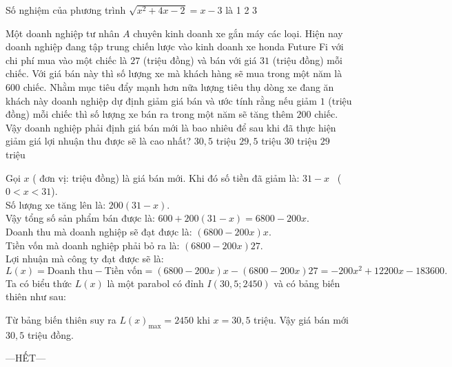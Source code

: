 \begin{ex}
	Số nghiệm của phương trình $\sqrt{x^{2}+4x-2}=x-3$ là
	\choice
	{}
	{1}
	{2}
	{3}
\end{ex}
\begin{ex}%
	Một doanh nghiệp tư nhân $A$ chuyên kinh doanh xe gắn máy các loại. Hiện nay doanh nghiệp đang tập trung chiến lược vào kinh doanh xe honda Future Fi với chi phí mua vào một chiếc là $27$ (triệu đồng) và bán với giá $31$ (triệu đồng) mỗi chiếc. Với giá bán này thì số lượng xe mà khách hàng sẽ mua trong một năm là $600$ chiếc. Nhằm mục tiêu đẩy mạnh hơn nữa lượng tiêu thụ dòng xe đang ăn khách này doanh nghiệp dự định giảm giá bán và ước tính rằng nếu giảm $1$ (triệu đồng) mỗi chiếc thì số lượng xe bán ra trong một năm sẽ tăng thêm $200$ chiếc. Vậy doanh nghiệp phải định giá bán mới là bao nhiêu để sau khi đã thực hiện giảm giá lợi nhuận thu được sẽ là cao nhất?
	\choice
	{\True $30,5$ triệu}
	{$29,5$ triệu}
	{$30$ triệu}
	{$29$ triệu}
	\loigiai
	{
		Gọi $x$ ( đơn vị: triệu đồng) là giá bán mới. Khi đó số tiền đã giảm là: $31-x$ \, ($0<x<31$). \\
		Số lượng xe tăng lên là: $200(31-x)$.\\
		Vậy tổng số sản phẩm bán được là: $600+ 200(31-x ) =6800-200x$.\\
		Doanh thu mà doanh nghiệp sẽ đạt được là: $(6800 -200x)x$.\\
		Tiền vốn mà doanh nghiệp phải bỏ ra là: $(6800 -200x)27$.\\
		Lợi nhuận mà công ty đạt được sẽ là:
		\[L(x)= \text{Doanh thu} -\text{Tiền vốn} =(6800 -200x)x-(6800 -200x)27=-200x^2+12200x-183600.\]
		Ta có biểu thức $L(x)$ là một parabol có đỉnh $I(30,5;2450)$ và có bảng biến thiên như sau:
		\begin{center}
		\end{center}
		Từ bảng biến thiên suy ra $L(x)_{\max} =2450$ khi $x=30,5$ triệu. Vậy giá bán mới $30,5$ triệu đồng.
	}
\end{ex}
\centerline{---HẾT---}
